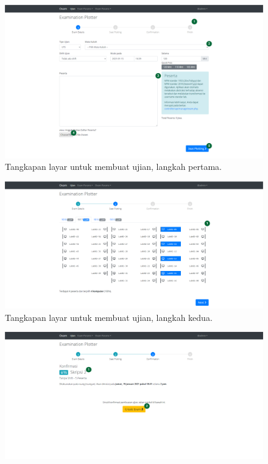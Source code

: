     \begin{figure}
        \centering
        \includegraphics[width=0.7\paperwidth]{Gambar/implemented-interface/admin/ujian-make-1.png}
        \caption{Tangkapan layar untuk membuat ujian, langkah pertama.}
        \label{fig:screenshot-admin-exam-make-1}
    \end{figure}\begin{figure}
        \centering
        \includegraphics[width=0.7\paperwidth]{Gambar/implemented-interface/admin/ujian-make-2.png}
        \caption{Tangkapan layar untuk membuat ujian, langkah kedua.}
        \label{fig:screenshot-admin-exam-make-2}
    \end{figure}\begin{figure}
        \centering
        \includegraphics[width=0.7\paperwidth]{Gambar/implemented-interface/admin/ujian-make-3.png}

\end{figure}

